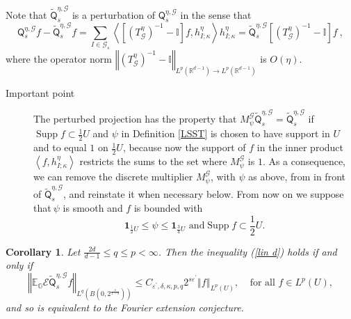 \documentclass{amsart}%
\theoremstyle{plain}
\newtheorem{corollary}[theorem]{Corollary}
\numberwithin{equation}{section}
\begin{document}
Note that $\widetilde{\mathsf{Q}}_{s}^{\eta,\mathcal{G}}$ is a perturbation of
$\mathsf{Q}_{s}^{\eta,\mathcal{G}}$ in the sense that%
\begin{equation}
\mathsf{Q}_{s}^{\eta,\mathcal{G}}f-\widetilde{\mathsf{Q}}_{s}^{\eta
,\mathcal{G}}f=\sum_{I\in\mathcal{G}_{s}}\left\langle \left[  \left(
T_{\mathcal{G}}^{\eta}\right)  ^{-1}-\mathbb{I}\right]  f,h_{I;\kappa}^{\eta
}\right\rangle h_{I;\kappa}^{\eta}=\widetilde{\mathsf{Q}}_{s}^{\eta
,\mathcal{G}}\left[  \left(  T_{\mathcal{G}}^{\eta}\right)  ^{-1}%
-\mathbb{I}\right]  f\ ,\label{pert id}%
\end{equation}
where the operator norm $\left\Vert \left(  T_{\mathcal{G}}^{\eta}\right)
^{-1}-\mathbb{I}\right\Vert _{L^{p}\left(  \mathbb{R}^{d-1}\right)
\rightarrow L^{p}\left(  \mathbb{R}^{d-1}\right)  }$ is $O\left(  \eta\right)
$.

\begin{description}
\item[Important point] The perturbed projection has the property that
$M_{\psi}^{\mathcal{G}}\widetilde{\mathsf{Q}}_{s}^{\eta,\mathcal{G}%
}=\widetilde{\mathsf{Q}}_{s}^{\eta,\mathcal{G}}$ if $\operatorname*{Supp}%
f\subset\frac{1}{2}U$ and $\psi$ in Definition \ref{LSST} is chosen to have
support in $U$ and to equal $1$ on $\frac{1}{2}U$, because now the support of
$f$ in the inner product $\left\langle f,h_{I;\kappa}^{\eta}\right\rangle $
restricts the sums to the set where $M_{\psi}^{\mathcal{G}}$ is $1$. As a
consequence, we can remove the discrete multiplier $M_{\psi}^{\mathcal{G}}$,
with $\psi$ as above, from in front of $\widetilde{\mathsf{Q}}_{s}%
^{\eta,\mathcal{G}}$, and reinstate it when necessary below. From now on we
suppose that$\ \psi$ is smooth and $f$ is bounded with
\begin{equation}
\mathbf{1}_{\frac{1}{2}U}\leq\psi\leq\mathbf{1}_{\frac{3}{4}U}\text{ and
}\operatorname*{Supp}f\subset\frac{1}{2}U.\label{psi and f}%
\end{equation}

\end{description}

\begin{corollary}
\label{Cor LSST}Let $\frac{2d}{d-1}\leq q\leq p<\infty$. Then the inequality
(\ref{lin d}) holds if and only if%
\begin{equation}
\left\Vert \mathbb{E}_{\mathbb{G}}\mathcal{E}\widetilde{\mathsf{Q}}_{s}%
^{\eta,\mathcal{G}}f\right\Vert _{L^{q}\left(  B\left(  0,2^{\frac{s}%
{1-\delta}}\right)  \right)  }\leq C_{\varepsilon^{\prime},\delta,\kappa
,p,q}2^{s\varepsilon^{\prime}}\left\Vert f\right\Vert _{L^{p}\left(  U\right)
},\ \ \ \ \ \text{for all }f\in L^{p}\left(  U\right)  ,\label{lin d'}%
\end{equation}
and so is equivalent to the Fourier extension conjecture.
\end{corollary}
\end{document}

